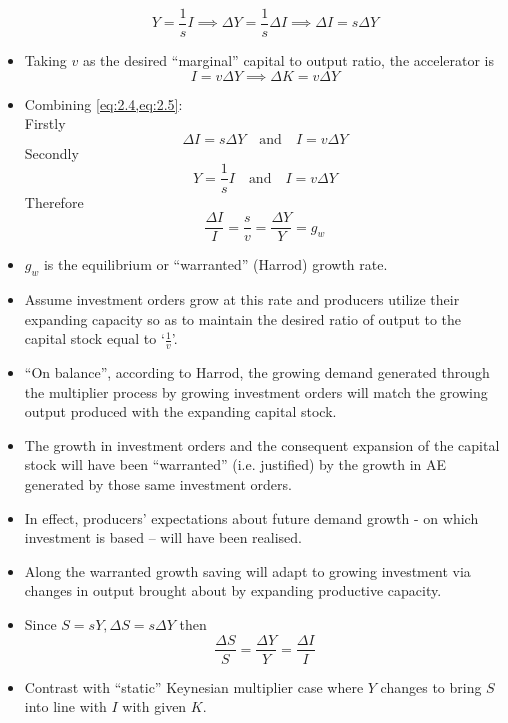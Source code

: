 \documentclass{article}
\begin{document}
\begin{itemize}
		\begin{equation}
			Y = \frac{1}{s} I \implies \Delta Y = \frac{1}{s} \Delta I \implies \Delta I = s \Delta Y \label{eq:2.4}
		\end{equation}
		\item Taking \( v \) as the desired ``marginal'' capital to output ratio, the accelerator is
		\begin{equation}
			I = v \Delta Y \implies \Delta K = v \Delta Y \label{eq:2.5}
		\end{equation}
		\item Combining \cref{eq:2.4,eq:2.5}:\\
		Firstly
		\[
			\Delta I = s \Delta Y \quad\text{and}\quad I = v \Delta Y
		\]
		Secondly
		\[
			Y = \frac{1}{s} I \quad\text{and}\quad I = v \Delta Y
		\]
		Therefore
		\begin{equation}
			\frac{\Delta I}{I} = \frac{s}{v} = \frac{\Delta Y}{Y} = g_w \label{eq:2.6}
		\end{equation}
		\item \( g_w \) is the equilibrium or ``warranted'' (Harrod) growth rate.
		\item Assume investment orders grow at this rate and producers utilize their expanding capacity so as to maintain the desired ratio of output to the capital stock equal to `\( \frac{1}{v} \)'. 
		\item ``On balance'', according to Harrod, the growing demand generated through the multiplier process by growing investment orders will match the growing output produced with the expanding capital stock.
		\item The growth in investment orders  and the consequent expansion of the capital stock will have been ``warranted'' (i.e. justified) by the growth in AE generated by those same investment orders. 
		\item In effect, producers' expectations about future demand growth - on which investment is based -- will have been realised.
		\item Along the warranted growth saving will adapt to growing investment via changes in output brought about by expanding productive capacity.
		\item Since \( S = sY, \Delta S = s \Delta Y \) then
		\begin{equation}
			\frac{\Delta S}{S} = \frac{\Delta Y}{Y} = \frac{\Delta I}{I} \label{eq:2.7}
		\end{equation}
		\item Contrast with ``static'' Keynesian multiplier case where \( Y \) changes to bring \( S \) into line with \( I \) with given \( K \).

\end{itemize}
\end{document}
